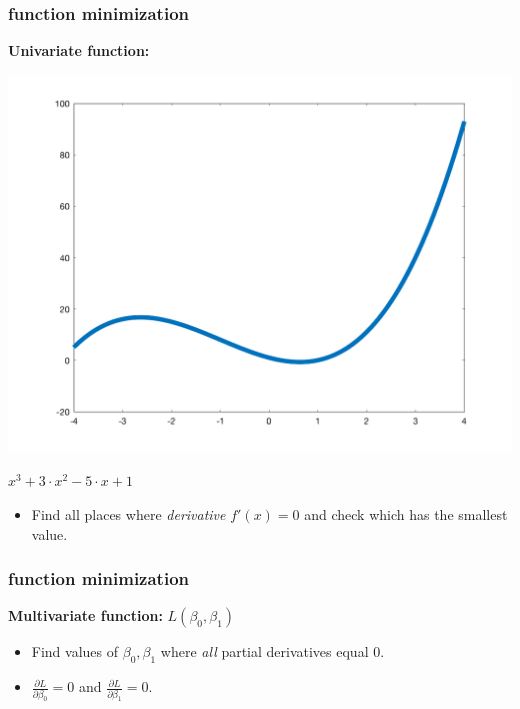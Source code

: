 \documentclass[handout,compress]{beamer}
\begin{document}
\begin{frame}
		\frametitle{function minimization}
		\textbf{Univariate function:}
		\begin{center}
			\includegraphics[width=.6\textwidth]{curve.png}
			
			$x^3 + 3\cdot x^2 - 5 \cdot x + 1$
		\end{center}
	\begin{itemize}
		\item Find all places where \emph{derivative} $f'(x) = 0$ and check which has the smallest value.
	\end{itemize}\end{frame}

\begin{frame}[t]
	\frametitle{function minimization}
	\textbf{Multivariate function:} $L(\beta_0, \beta_1)$
	\begin{itemize}
		\item Find  values of $\beta_0,\beta_1$ where \emph{all} partial derivatives equal $0$.
		\item $\frac{\partial L}{\partial \beta_0} = 0$ and $\frac{\partial L}{\partial \beta_1} = 0$.
	\end{itemize}

\end{frame}
\end{document}

